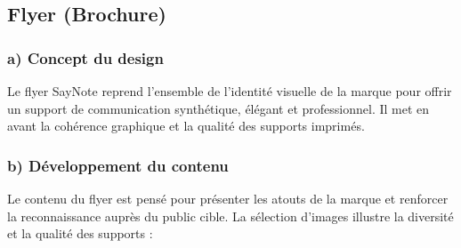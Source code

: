 \subsection{Flyer (Brochure)}
\subsubsection*{a) Concept du design}
Le flyer SayNote reprend l’ensemble de l’identité visuelle de la marque pour offrir un support de communication synthétique, élégant et professionnel. Il met en avant la cohérence graphique et la qualité des supports imprimés.

\subsubsection*{b) Développement du contenu}
Le contenu du flyer est pensé pour présenter les atouts de la marque et renforcer la reconnaissance auprès du public cible. La sélection d’images illustre la diversité et la qualité des supports :

